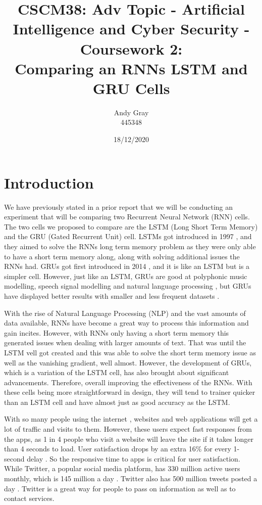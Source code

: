 \documentclass[a4paper,10pt]{article}
\begin{document}
\title{CSCM38: Adv Topic - Artificial Intelligence and Cyber Security - Coursework 2: \\ Comparing an RNNs LSTM and GRU Cells}
\author{Andy Gray\\445348}
\date{18/12/2020}

\maketitle

\section{Introduction}
\label{sec:intro}
	We have previously stated in a prior report that we will be conducting an experiment that will be comparing two Recurrent Neural Network (RNN) cells. The two cells we proposed to compare are the LSTM (Long Short Term Memory) and the GRU (Gated Recurrent Unit) cell. LSTMs got introduced in 1997 \cite{hochreiter1997long}, and they aimed to solve the RNNs long term memory problem as they were only able to have a short term memory along, along with solving additional issues the RNNs had. GRUs got first introduced in 2014 \cite{cho2014learning}, and it is like an LSTM but is a simpler cell. However, just like an LSTM, GRUs are good at polyphonic music modelling, speech signal modelling and natural language processing \cite{geron2019hands}, but GRUs have displayed better results with smaller and less frequent datasets \cite{chung2014empirical}.

	With the rise of Natural Language Processing (NLP) and the vast amounts of data available, RNNs have become a great way to process this information and gain incites. However, with RNNs only having a short term memory this generated issues when dealing with larger amounts of text. That was until the LSTM vell got created and this was able to solve the short term memory issue as well as the vanishing gradient, well almost. However, the development of GRUs, which is a variation of the LSTM cell, has also brought about significant advancements. Therefore, overall improving the effectiveness of the RNNs. With these cells being more straightforward in design, they will tend to trainer quicker than an LSTM cell and have almost just as good accuracy as the LSTM. 

	With so many people using the internet \cite{internet_facts}, websites and web applications will get a lot of traffic and visits to them. However, these users expect fast responses from the apps, as 1 in 4 people who visit a website will leave the site if it takes longer than 4 seconds to load. User satisfaction drops by an extra 16\% for every 1-second delay \cite{internet_speed}. So the responsive time to apps is critical for user satisfaction. While Twitter, a popular social media platform, has 330 million active users monthly, which is 145 million a day \cite{twitter_facts}.  Twitter also has 500 million tweets posted a day \cite{twitter_facts}. Twitter is a great way for people to pass on information as well as to contact services.
	
\end{document}

